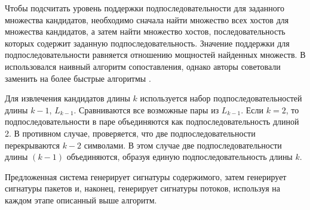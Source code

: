 Чтобы подсчитать уровень поддержки подпоследовательности для заданного множества кандидатов, необходимо сначала найти множество всех хостов для
множества кандидатов, а затем найти множество хостов, последовательность которых содержит заданную подпоследовательность.
Значение поддержки для подпоследовательности равняется отношению мощностей найденных множеств.
В \cite{shim2017sigbox} использовался наивный алгоритм сопоставления, однако авторы советовали заменить на более быстрые алгоритмы
\cite{karp1987efficient,boyer1977fast,xie2010improved,zhou2019research}.

Для извлечения кандидатов длины $k$ используется набор подпоследовательностей длины $k-1$, $L_{k-1}$.
Сравниваются все возможные пары из $L_{k-1}$.
Если $k = 2$, то подпоследовательности в паре объединяются как подпоследовательность длиной 2.
В противном случае, проверяется, что две подпоследовательности перекрываются $k-2$ символами.
В этом случае две подпоследовательности длины $(k-1)$ объединяются, образуя единую подпоследовательность длины $k$.

Предложенная система генерирует сигнатуры содержимого, затем генерирует сигнатуры пакетов и, наконец, генерирует сигнатуры потоков, используя на каждом этапе описанный выше алгоритм.

\newpage
